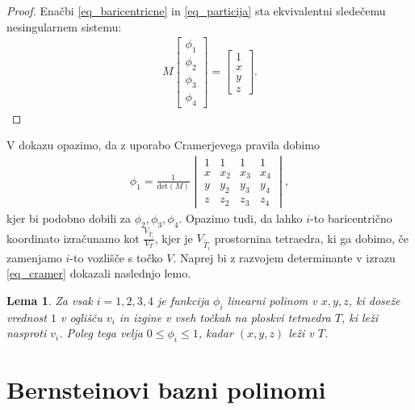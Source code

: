 \documentclass[11pt,a4paper]{article}
\newtheorem{lemma}{Lema}
\begin{document}
\begin{proof}
    Enačbi \ref{eq_baricentricne} in \ref{eq_particija} sta ekvivalentni
    sledečemu nesingularnem sistemu:
    \begin{align}
        M \begin{bmatrix}\phi_1 \\ \phi_2 \\ \phi_3 \\ \phi_4 \end{bmatrix} = \begin{bmatrix}
            1 \\ x \\ y \\ z \end{bmatrix}.
    \end{align}
\end{proof}

V dokazu opazimo, da z uporabo Cramerjevega pravila dobimo
\begin{align}\label{eq_cramer}
    \phi_1 = \frac{1}{\text{det}(M)}
    \begin{vmatrix}
        1 & 1 & 1 & 1 \\
        x & x_2 & x_3 & x_4 \\
        y & y_2 & y_3 & y_4 \\
        z & z_2 & z_3 & z_4
    \end{vmatrix},
\end{align}
kjer bi podobno dobili za $\phi_2, \phi_3, \phi_4$. 
Opazimo tudi, da lahko $i$-to baricentrično koordinato izračunamo
kot $\frac{V_{\widetilde{T_i}}}{V_T}$, kjer je $V_{\widetilde{T_i}}$
prostornina tetraedra, ki ga dobimo, če zamenjamo $i$-to vozlišče
s točko $V$. 
Naprej bi z razvojem determinante v izrazu \ref{eq_cramer}
dokazali naslednjo lemo.

\begin{lemma}
    Za vsak $i = 1, 2, 3, 4$ je funkcija $\phi_i$ linearni polinom
    v $x, y, z$, ki doseže vrednost $1$ v oglišču $v_i$ in
    izgine v vseh točkah na ploskvi tetraedra $T$, ki leži
    nasproti $v_i$. Poleg tega velja
    $0 \leq \phi_i \leq 1$, kadar $(x, y, z)$ leži v $T$.
\end{lemma}

\section{Bernsteinovi bazni polinomi}
\end{document}
